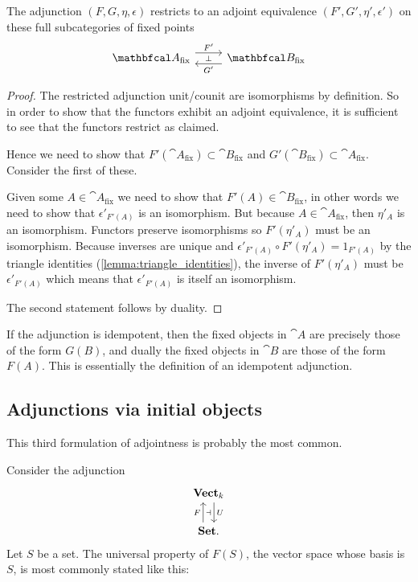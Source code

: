 \documentclass[11pt,a4paper]{article}
\begin{document}
\begin{proposition}
    The adjunction $(F,G,\eta,\epsilon)$ restricts to an adjoint equivalence $(F',G',\eta',\epsilon')$ on these full subcategories of fixed points
    \begin{equation*}
    \begin{tikzcd}
        \cat{A}_{\text{fix}} \arrow[r, shift left=2, "F'"] &
        \cat{B}_{\text{fix}} \arrow[l, shift left=2, "G'", "\bot"']
    \end{tikzcd}
    \end{equation*}
\end{proposition}
\begin{proof}
    The restricted adjunction unit/counit are isomorphisms by definition. So in order to show that the functors exhibit an adjoint equivalence, it is sufficient to see that the functors restrict as claimed.\par
    Hence we need to show that $F'(\cat{A}_{\text{fix}}) \subset  \cat{B}_{\text{fix}}$ and $G'(\cat{B}_{\text{fix}}) \subset \cat{A}_{\text{fix}}$. Consider the first of these.\par
    Given some $A\in\cat{A}_{\text{fix}}$ we need to show that $F'(A)\in\cat{B}_{\text{fix}}$, in other words we need to show that $\epsilon'_{F'(A)}$ is an isomorphism. But because $A\in\cat{A}_{\text{fix}}$, then $\eta'_A$ is an isomorphism. Functors preserve isomorphisms so $F'(\eta'_A)$ must be an isomorphism. Because inverses are unique and $\epsilon'_{F'(A)} \circ F'(\eta'_A) = 1_{F'(A)}$ by the triangle identities (\ref{lemma:triangle_identities}), the inverse of $F'(\eta'_A)$ must be $\epsilon'_{F'(A)}$ which means that $\epsilon'_{F'(A)}$ is itself an isomorphism.\par
    The second statement follows by duality.
\end{proof}

If the adjunction is idempotent, then the fixed objects in $\cat{A}$ are precisely those of the form $G(B)$, and dually the fixed objects in $\cat{B}$ are those of the form $F(A)$. This is essentially the definition of an idempotent adjunction.

\subsection{Adjunctions via initial objects}
This third formulation of adjointness is probably the most common.\par
Consider the adjunction
\begin{equation*}
\begin{tikzcd}
    \bcat{Vect}_k \arrow[d, shift left=2, "U", "\dashv"'] \\
    \bcat{Set.} \arrow[u, shift left=2, "F"]
\end{tikzcd}
\end{equation*}
Let $S$ be a set. The universal property of $F(S)$, the vector space whose basis is $S$, is most commonly stated like this:\par
\end{document}
